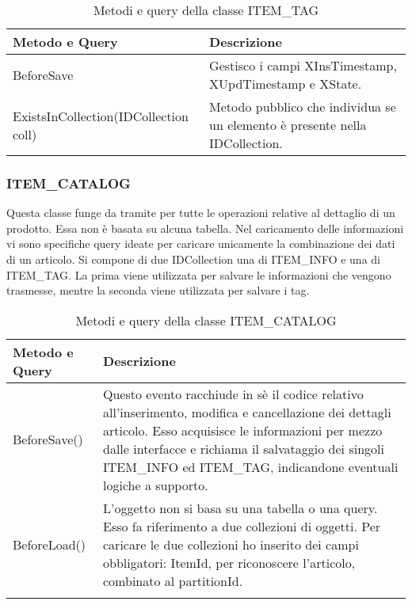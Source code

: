 	\begin{table}[h]
		\centering
		\begin{tabular}{ p{5cm}|p{} }
			\hline
			\textbf{Metodo e Query} & \textbf{Descrizione}\\
			\hline
			BeforeSave& Gestisco i campi XInsTimestamp, XUpdTimestamp e XState.\\
			\hline
			ExistsInCollection(IDCollection coll) & Metodo pubblico che individua se un elemento è presente nella IDCollection.\\
			
		\end{tabular}
		\caption{Metodi e query della classe ITEM\_TAG}
	\end{table}

\subsubsection{ITEM\_CATALOG}
Questa classe funge da tramite per tutte le operazioni relative al dettaglio di un prodotto. Essa non è basata su alcuna tabella. Nel caricamento delle informazioni vi sono specifiche query ideate per caricare unicamente la combinazione dei dati di un articolo. Si compone di due IDCollection una di ITEM\_INFO e una di ITEM\_TAG. La prima viene utilizzata per salvare le informazioni che vengono trasmesse, mentre la seconda viene utilizzata per salvare i tag.

	\begin{longtable}{ p{3cm}|p{} }
		\hline
		\textbf{Metodo e Query} & \textbf{Descrizione}\\
		\hline
		BeforeSave()& Questo evento racchiude in sè il codice relativo all'inserimento, modifica e cancellazione dei dettagli articolo. Esso acquisisce le informazioni per mezzo dalle interfacce e richiama il salvataggio dei singoli ITEM\_INFO ed ITEM\_TAG, indicandone eventuali logiche a supporto.\\
		\hline
		BeforeLoad()& L'oggetto non si basa su una tabella o una query. Esso fa riferimento a due collezioni di oggetti. Per caricare le due collezioni ho inserito dei campi obbligatori: ItemId, per riconoscere l'articolo, combinato al partitionId.  \\
\caption{Metodi e query della classe ITEM\_CATALOG}
		
	\end{longtable}




